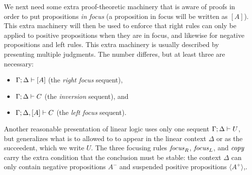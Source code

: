 We next need some extra proof-theoretic machinery that is 
aware of proofs in order to put
propositions {\it in focus} (a proposition in focus will be written as
$[A]$). This extra machinery will then be used to enforce that right
rules can only be applied to positive propositions when they are in
focus, and likewise for negative propositions and left rules.  This
extra machinery is usually described by presenting multiple judgments.
The number differes, but at least three are necessary:

\begin{itemize}
\item ${\Gamma};{\Delta} \vdash [{A}] \mathstrut$ (the {\it right focus} sequent),
\item ${\Gamma};{\Delta} \vdash {C} \mathstrut$ (the {\it inversion} sequent), and
\item ${\Gamma};{\Delta}, [{A}] \vdash {C} \mathstrut$ (the {\it left focus} sequent).
\end{itemize}




Another reasonable presentation of linear logic uses only one sequent
${\Gamma};{\Delta} \vdash {U} \mathstrut$, but generalizes what is to allowed to
to appear in the linear context $\Delta$ or as the succeedent, which
we write $U$. The three focusing rules
${\it focus}_R$, ${\it focus}_L$, and ${\it copy}$ carry the extra condition
that the conclusion must be stable: the context $\Delta$ can only contain 
negative propositions $A^-$ and suspended positive propositions 
$\langle A^+ \rangle$,.

